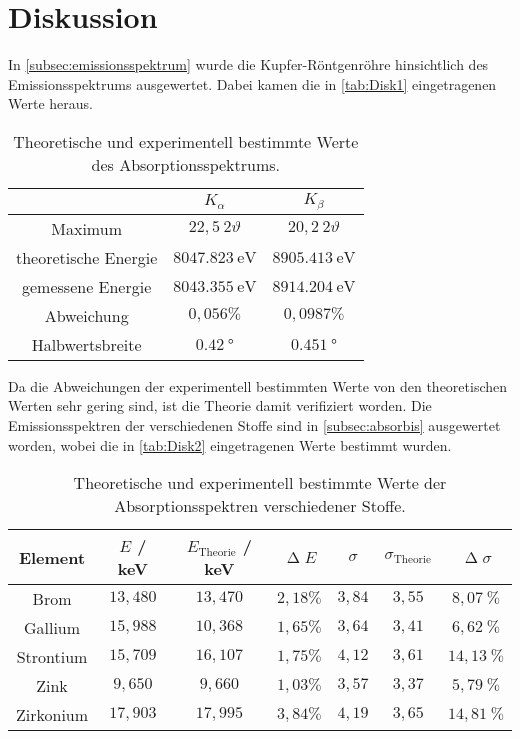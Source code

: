 \section{Diskussion}
\label{sec:Diskussion}
In \autoref{subsec:emissionsspektrum} wurde die Kupfer-Röntgenröhre hinsichtlich des Emissionsspektrums ausgewertet. Dabei kamen die in \autoref{tab:Disk1} eingetragenen Werte heraus.

\begin{table}[H]
    \caption{Theoretische und experimentell bestimmte Werte des Absorptionsspektrums.}
    \label{tab:Disk1}
    \centering
    \begin{tabular}{c c c}
        \toprule
         & $K_\alpha$ & $K_\beta$\\
        \midrule
        Maximum & $22,5 ~ 2\vartheta$ & $20,2 ~ 2\vartheta$ \\
        theoretische Energie & $\SI{8047,823}{\eV}$ & $\SI{8905,413}{\eV}$ \\
        gemessene Energie & $\SI{8043,355}{\eV}$ & $\SI{8914,204}{\eV}$ \\
        Abweichung & $0,056 \%$ & $0,0987 \%$ \\
        Halbwertsbreite & $\SI{0,42}{\degree}$ & $\SI{0,451}{\degree}$ \\
        \bottomrule
    \end{tabular}
\end{table}
Da die Abweichungen der experimentell bestimmten Werte von den theoretischen Werten \cite{NistXray} \cite{Abschirmkonstanten} sehr gering sind, ist die Theorie damit verifiziert worden.\newline
Die Emissionsspektren der verschiedenen Stoffe sind in \autoref{subsec:absorbis} ausgewertet worden, wobei die in \autoref{tab:Disk2} eingetragenen Werte bestimmt wurden.
\begin{table}[H]
    \caption{Theoretische und experimentell bestimmte Werte der Absorptionsspektren verschiedener Stoffe.}
    \centering
    \label{tab:Disk2}
    \begin{tabular}{c| c c c c c c}
        \toprule
        Element  & $E$ / keV & $E_{\text{Theorie}}$ / keV & $\upDelta E$ & $\sigma$ & $\sigma_{\text{Theorie}}$ & $\upDelta \sigma$ \\
        \midrule
        Brom      & $13,480$  & $13,470$  & $2,18 \%$ & $3,84$ & $3,55$ & $8,07  ~\%$ \\
        Gallium   & $15,988$  & $10,368$  & $1,65 \%$ & $3,64$ & $3,41$ & $6,62  ~\%$ \\
        Strontium & $15,709$  & $16,107$  & $1,75 \%$ & $4,12$ & $3,61$ & $14,13 ~\%$ \\
        Zink      & $9,650$   & $9,660$   & $1,03 \%$ & $3,57$ & $3,37$ & $5,79  ~\%$ \\
        Zirkonium & $17,903$  & $17,995$  & $3,84 \%$ & $4,19$ & $3,65$ & $14,81 ~\%$ \\
        \bottomrule
    \end{tabular}
\end{table}
